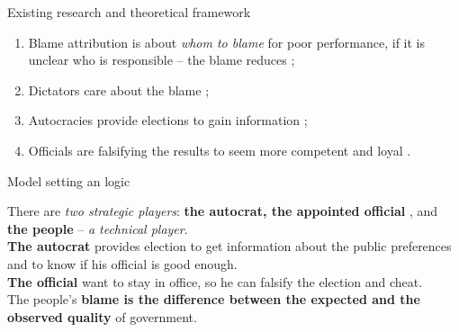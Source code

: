 \documentclass{beamer}
\begin{document}
    
    


\begin{frame}{\hypertarget{theory}{Existing research and theoretical framework}}
    \begin{enumerate}

        \item Blame attribution is about \textit{whom to blame} for poor performance, if it is unclear who is responsible -- the blame reduces \parencite{econvote_polit, Hood2009};
        
        \item Dictators care about the blame \parencite{autocblame, legislaturesandblame};
        
        \item Autocracies provide elections to gain information \parencite{parties_elections, localfraud};
        
        \item Officials are falsifying the results to seem more competent and loyal \parencite{morethanwin, power_sharing}.
        
    \end{enumerate}
\end{frame}

\begin{frame}{Model setting an logic}
    \centering
    
    There are \textit{two strategic players}: \textbf{the autocrat, the appointed official} \parencite{loyal_competent_1}, and \textbf{the people} -- \textit{a technical player}.
    \\
    \textbf{The autocrat} provides election to get information about the public preferences and to know if his official is good enough.
    \\
    \textbf{The official} want to stay in office, so he can falsify the election and cheat.\\
    The people's \textbf{blame is the difference between the expected and the observed quality} of government.
    
    
    
\end{frame}
\end{document}
